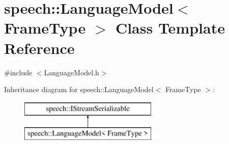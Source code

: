 \hypertarget{classspeech_1_1LanguageModel}{\section{speech\+:\+:Language\+Model$<$ Frame\+Type $>$ Class Template Reference}
\label{classspeech_1_1LanguageModel}
}


{\ttfamily \#include $<$Language\+Model.\+h$>$}

Inheritance diagram for speech\+:\+:Language\+Model$<$ Frame\+Type $>$\+:\begin{figure}[H]
\begin{center}
\leavevmode
\includegraphics[height=2.000000cm]{classspeech_1_1LanguageModel}
\end{center}
\end{figure}
